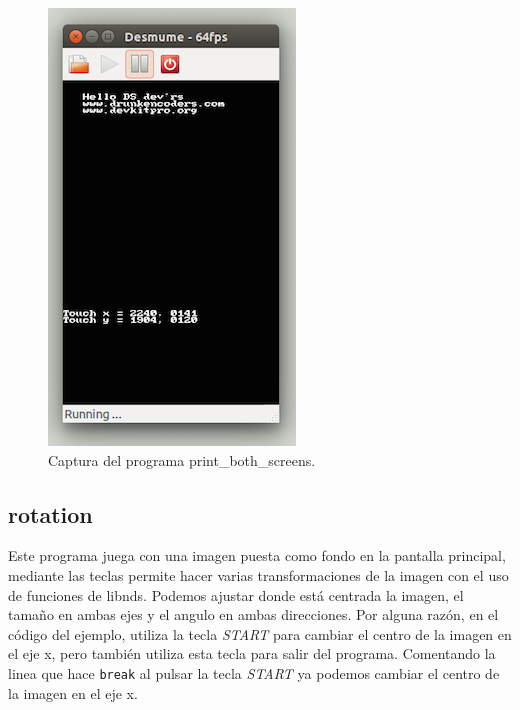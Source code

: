 \documentclass[12pt,english]{article}
\begin{document}
    \begin{figure}[H] 
    \centering
    \includegraphics[scale=0.5]{images/print_both_screens}
    \caption{Captura del programa print\_both\_screens.}
    \end{figure}

    \newpage

    \subsection{rotation}

    Este programa juega con una imagen puesta como fondo en la pantalla principal, mediante las teclas permite hacer varias transformaciones de la imagen con el uso de funciones de libnds. Podemos ajustar donde está centrada la imagen, el tamaño en ambas ejes y el angulo en ambas direcciones. Por alguna razón, en el código del ejemplo, utiliza la tecla \emph{START} para cambiar el centro de la imagen en el eje x, pero también utiliza esta tecla para salir del programa. Comentando la linea que hace \texttt{break} al pulsar la tecla \emph{START} ya podemos cambiar el centro de la imagen en el eje x.
\end{document}

